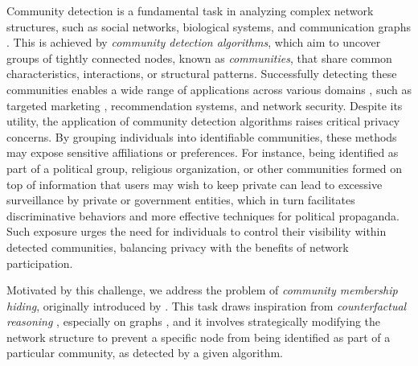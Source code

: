 Community detection is a fundamental task in analyzing complex network structures, such as social networks, biological systems, and communication graphs \cite{fortunato2010pr}. This is achieved by \emph{community detection algorithms}, which aim to uncover groups of tightly connected nodes, known as \emph{communities}, that share common characteristics, interactions, or structural patterns.
Successfully detecting these communities enables a wide range of applications across various domains \cite{karastas2018ibigdelft}, such as targeted marketing \cite{mosadegh2011ajbmr}, recommendation systems, and network security. Despite its utility, the application of community detection algorithms raises critical privacy concerns. By grouping individuals into identifiable communities, these methods may expose sensitive affiliations or preferences. For instance, being identified as part of a political group, religious organization, or other communities formed on top of information that users may wish to keep private can lead to excessive surveillance by private or government entities, which in turn facilitates discriminative behaviors and more effective techniques for political propaganda. Such exposure urges the need for individuals to control their visibility within detected communities, balancing privacy with the benefits of network participation. 

Motivated by this challenge, we address the problem of \emph{community membership hiding}, originally introduced by \citet{bernini2024kdd}.
This task draws inspiration from \emph{counterfactual reasoning} \cite{tolomei2021tkde,tolomei2017kdd}, especially on graphs \cite{lucic2022aistats}, and it involves strategically modifying the network structure to prevent a specific node from being identified as part of a particular community, as detected by a given algorithm.


